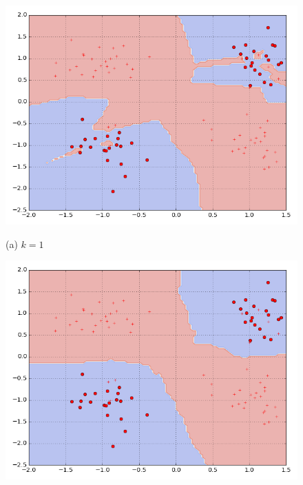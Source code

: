 \documentclass{report}
\begin{document}
\begin{figure}[t]
    \begin{minipage}{0.32\textwidth}
        \centering
        \includegraphics[width=\columnwidth]{figures/knn_1.png}

        (a) $k=1$
    \end{minipage}
    \hfill
    \begin{minipage}{0.32\textwidth}
        \centering
        \includegraphics[width=\columnwidth]{figures/knn_5.png}


\end{minipage}
\end{figure}
\end{document}
